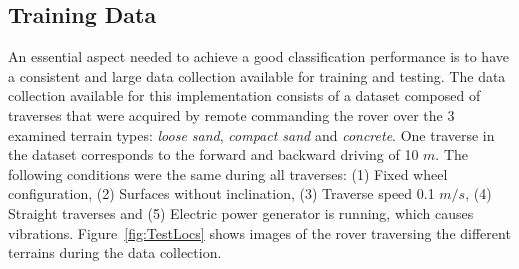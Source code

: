 \subsection{Training Data}

An essential aspect needed to achieve a good classification performance is to have a consistent and large data collection available for training and testing. 
The data collection available for this implementation consists of a dataset composed of traverses that were acquired by remote commanding the rover over the 3 examined terrain types: \emph{loose sand}, \emph{compact sand} and \emph{concrete}. 
One traverse in the dataset corresponds to the forward and backward driving of 10 $m$. 
The following conditions were the same during all traverses: (1) Fixed wheel configuration, (2) Surfaces without inclination, (3) Traverse speed 0.1 $m/s$, (4) Straight traverses and (5) Electric power generator is running, which causes vibrations.
Figure~\ref{fig:TestLocs} shows images of the rover traversing the different terrains during the data collection.


